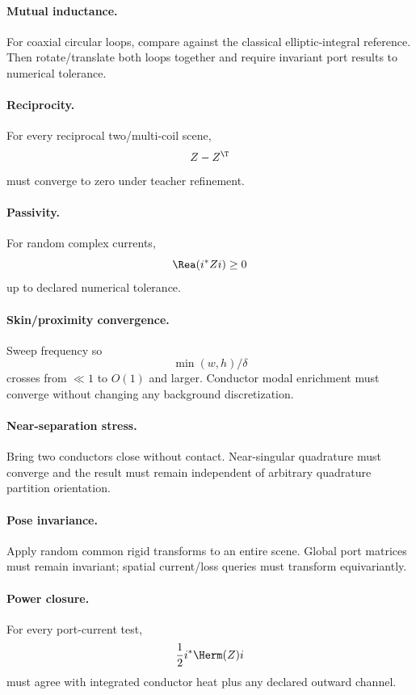 \paragraph{Mutual inductance.}
For coaxial circular loops, compare against the classical elliptic-integral
reference. Then rotate/translate both loops together and require invariant port
results to numerical tolerance.

\paragraph{Reciprocity.}
For every reciprocal two/multi-coil scene,
\[
 Z-Z^\T
\]
must converge to zero under teacher refinement.

\paragraph{Passivity.}
For random complex currents,
\[
 \Rea(i^\ast Zi)\ge0
\]
up to declared numerical tolerance.

\paragraph{Skin/proximity convergence.}
Sweep frequency so
\[
 \min(w,h)/\delta
\]
crosses from $\ll1$ to $O(1)$ and larger. Conductor modal enrichment must
converge without changing any background discretization.

\paragraph{Near-separation stress.}
Bring two conductors close without contact. Near-singular quadrature must
converge and the result must remain independent of arbitrary quadrature
partition orientation.

\paragraph{Pose invariance.}
Apply random common rigid transforms to an entire scene. Global port matrices
must remain invariant; spatial current/loss queries must transform
equivariantly.

\paragraph{Power closure.}
For every port-current test,
\[
 \frac12 i^\ast\Herm(Z)i
\]
must agree with integrated conductor heat plus any declared outward channel.

